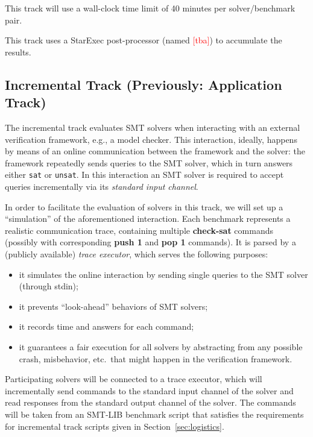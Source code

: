 \documentclass[12pt]{article}
\newcommand{\akey}[1]{\textbf{#1}}
\newcommand{\rem}[1]{\textcolor{red}{[#1]}}
\begin{document}
This track will use a wall-clock time limit of 40 minutes per solver/benchmark
pair.

This track uses a StarExec post-processor (named \rem{tba}) to accumulate the
results.

\subsection{Incremental Track (Previously: Application Track)}
\label{sec:exec:app}

The incremental track evaluates SMT solvers when interacting with an
external verification framework, e.g., a model checker. This
interaction, ideally, happens by means of an online communication
between the framework and the solver: the framework repeatedly sends
queries to the SMT solver, which in turn answers either \texttt{sat}
or \texttt{unsat}.  In this interaction an SMT solver is required to
accept queries incrementally via its \emph{standard input channel}.

In order to facilitate the evaluation of solvers in this track, we will set up
a ``simulation'' of the aforementioned interaction.  Each benchmark represents
a realistic communication trace, containing multiple \akey{check-sat} commands
(possibly with corresponding \akey{push 1} and \akey{pop 1} commands). It is
parsed by a (publicly available) \emph{trace executor},
which serves the following purposes: \begin{itemize} \item it simulates the
online interaction by sending single queries to the SMT solver (through stdin);
\item it prevents ``look-ahead'' behaviors of SMT solvers;
\item it records time and answers for each command;
\item it guarantees a fair execution for all solvers by abstracting
  from any possible crash, misbehavior, etc.\ that might happen in the
  verification framework.
\end{itemize}

%
Participating solvers will be connected to a trace executor, which
will incrementally send commands to the standard input channel of the
solver and read responses from the standard output channel of the
solver.  The commands will be taken from an SMT-LIB benchmark script
that satisfies the requirements for incremental track scripts given in
Section~\ref{sec:logistics}.
\end{document}
